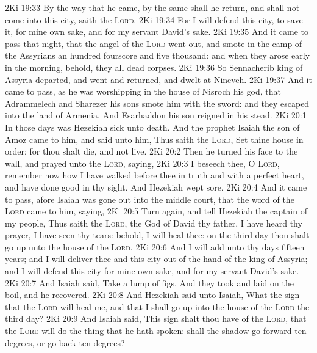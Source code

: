 \vs 2Ki 19:33 By the way that he came, by the same shall he return, and shall not come into this city, saith the \textsc{Lord}.
\vs 2Ki 19:34 For I will defend this city, to save it, for mine own sake, and for my servant David's sake.
\vs 2Ki 19:35 And it came to pass that night, that the angel of the \textsc{Lord} went out, and smote in the camp of the Assyrians an hundred fourscore and five thousand: and when they arose early in the morning, behold, they  all dead corpses.
\vs 2Ki 19:36 So Sennacherib king of Assyria departed, and went and returned, and dwelt at Nineveh.
\vs 2Ki 19:37 And it came to pass, as he was worshipping in the house of Nisroch his god, that Adrammelech and Sharezer his sons smote him with the sword: and they escaped into the land of Armenia. And Esarhaddon his son reigned in his stead.
\vs 2Ki 20:1 In those days was Hezekiah sick unto death. And the prophet Isaiah the son of Amoz came to him, and said unto him, Thus saith the \textsc{Lord}, Set thine house in order; for thou shalt die, and not live.
\vs 2Ki 20:2 Then he turned his face to the wall, and prayed unto the \textsc{Lord}, saying,
\vs 2Ki 20:3 I beseech thee, O \textsc{Lord}, remember now how I have walked before thee in truth and with a perfect heart, and have done  good in thy sight. And Hezekiah wept sore.
\vs 2Ki 20:4 And it came to pass, afore Isaiah was gone out into the middle court, that the word of the \textsc{Lord} came to him, saying,
\vs 2Ki 20:5 Turn again, and tell Hezekiah the captain of my people, Thus saith the \textsc{Lord}, the God of David thy father, I have heard thy prayer, I have seen thy tears: behold, I will heal thee: on the third day thou shalt go up unto the house of the \textsc{Lord}.
\vs 2Ki 20:6 And I will add unto thy days fifteen years; and I will deliver thee and this city out of the hand of the king of Assyria; and I will defend this city for mine own sake, and for my servant David's sake.
\vs 2Ki 20:7 And Isaiah said, Take a lump of figs. And they took and laid  on the boil, and he recovered.
\vs 2Ki 20:8 And Hezekiah said unto Isaiah, What  the sign that the \textsc{Lord} will heal me, and that I shall go up into the house of the \textsc{Lord} the third day?
\vs 2Ki 20:9 And Isaiah said, This sign shalt thou have of the \textsc{Lord}, that the \textsc{Lord} will do the thing that he hath spoken: shall the shadow go forward ten degrees, or go back ten degrees?
